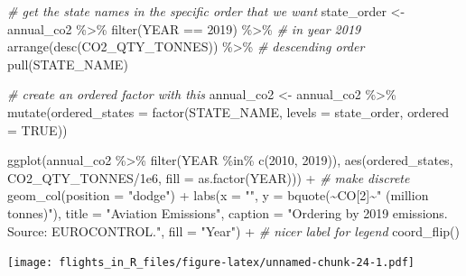 \documentclass[
]{book}
\newenvironment{Shaded}{\begin{snugshade}}{\end{snugshade}}
\newcommand{\AttributeTok}[1]{\textcolor[rgb]{0.77,0.63,0.00}{#1}}
\newcommand{\CommentTok}[1]{\textcolor[rgb]{0.56,0.35,0.01}{\textit{#1}}}
\newcommand{\ConstantTok}[1]{\textcolor[rgb]{0.00,0.00,0.00}{#1}}
\newcommand{\DecValTok}[1]{\textcolor[rgb]{0.00,0.00,0.81}{#1}}
\newcommand{\FloatTok}[1]{\textcolor[rgb]{0.00,0.00,0.81}{#1}}
\newcommand{\FunctionTok}[1]{\textcolor[rgb]{0.00,0.00,0.00}{#1}}
\newcommand{\NormalTok}[1]{#1}
\newcommand{\OtherTok}[1]{\textcolor[rgb]{0.56,0.35,0.01}{#1}}
\newcommand{\SpecialCharTok}[1]{\textcolor[rgb]{0.00,0.00,0.00}{#1}}
\newcommand{\StringTok}[1]{\textcolor[rgb]{0.31,0.60,0.02}{#1}}
\begin{document}
\begin{Shaded}
\begin{Highlighting}[]
\CommentTok{\# get the state names in the specific order that we want}
\NormalTok{state\_order }\OtherTok{\textless{}{-}}\NormalTok{ annual\_co2 }\SpecialCharTok{\%\textgreater{}\%} 
  \FunctionTok{filter}\NormalTok{(YEAR }\SpecialCharTok{==} \DecValTok{2019}\NormalTok{) }\SpecialCharTok{\%\textgreater{}\%}     \CommentTok{\# in year 2019}
  \FunctionTok{arrange}\NormalTok{(}\FunctionTok{desc}\NormalTok{(CO2\_QTY\_TONNES)) }\SpecialCharTok{\%\textgreater{}\%}  \CommentTok{\# descending order}
  \FunctionTok{pull}\NormalTok{(STATE\_NAME) }

\CommentTok{\# create an ordered factor with this}
\NormalTok{annual\_co2 }\OtherTok{\textless{}{-}}\NormalTok{ annual\_co2 }\SpecialCharTok{\%\textgreater{}\%} 
  \FunctionTok{mutate}\NormalTok{(}\AttributeTok{ordered\_states =} \FunctionTok{factor}\NormalTok{(STATE\_NAME, }
                                 \AttributeTok{levels =}\NormalTok{ state\_order, }\AttributeTok{ordered =} \ConstantTok{TRUE}\NormalTok{))}

\FunctionTok{ggplot}\NormalTok{(annual\_co2 }\SpecialCharTok{\%\textgreater{}\%} 
         \FunctionTok{filter}\NormalTok{(YEAR }\SpecialCharTok{\%in\%} \FunctionTok{c}\NormalTok{(}\DecValTok{2010}\NormalTok{, }\DecValTok{2019}\NormalTok{)), }
       \FunctionTok{aes}\NormalTok{(ordered\_states,}
\NormalTok{           CO2\_QTY\_TONNES}\SpecialCharTok{/}\FloatTok{1e6}\NormalTok{,}
           \AttributeTok{fill =} \FunctionTok{as.factor}\NormalTok{(YEAR))) }\SpecialCharTok{+}  \CommentTok{\# make discrete}
  \FunctionTok{geom\_col}\NormalTok{(}\AttributeTok{position =} \StringTok{"dodge"}\NormalTok{) }\SpecialCharTok{+}
  \FunctionTok{labs}\NormalTok{(}\AttributeTok{x =} \StringTok{""}\NormalTok{, }
       \AttributeTok{y =} \FunctionTok{bquote}\NormalTok{(}\SpecialCharTok{\textasciitilde{}}\NormalTok{CO[}\DecValTok{2}\NormalTok{]}\SpecialCharTok{\textasciitilde{}}\StringTok{" (million tonnes)"}\NormalTok{),}
       \AttributeTok{title =} \StringTok{"Aviation Emissions"}\NormalTok{,}
       \AttributeTok{caption =} \StringTok{"Ordering by 2019 emissions. Source: EUROCONTROL."}\NormalTok{,}
       \AttributeTok{fill =} \StringTok{"Year"}\NormalTok{) }\SpecialCharTok{+} \CommentTok{\# nicer label for legend}
  \FunctionTok{coord\_flip}\NormalTok{()}
\end{Highlighting}
\end{Shaded}

\texttt{[image: flights\_in\_R\_files/figure-latex/unnamed-chunk-24-1.pdf]}
\end{document}
